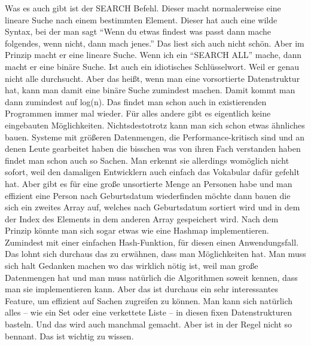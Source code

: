 {Was es auch gibt ist der SEARCH Befehl. Dieser macht normalerweise eine lineare Suche nach einem bestimmten Element. Dieser hat auch eine wilde Syntax, bei der man sagt ``Wenn du etwas findest was passt dann mache folgendes, wenn nicht, dann mach jenes.'' Das liest sich auch nicht schön. Aber im Prinzip macht er eine lineare Suche. Wenn ich ein ``SEARCH ALL'' mache, dann macht er eine binäre Suche. Ist auch ein idiotisches Schlüsselwort. Weil er genau nicht alle durchsucht. Aber das heißt, wenn man eine vorsortierte Datenstruktur hat, kann man damit eine binäre Suche zumindest machen. Damit kommt man dann zumindest auf log(n). Das findet man schon auch in existierenden Programmen immer mal wieder. Für alles andere gibt es eigentlich keine eingebauten Möglichkeiten. Nichtsdestotrotz kann man sich schon etwas ähnliches bauen. Systeme mit größeren Datenmengen, die Performance-kritisch sind und an denen Leute gearbeitet haben die bisschen was von ihren Fach verstanden haben findet man schon auch so Sachen. Man erkennt sie allerdings womöglich nicht sofort, weil den damaligen Entwicklern auch einfach das Vokabular dafür gefehlt hat. Aber \zB gibt es für eine große unsortierte Menge an Personen habe und man effizient eine Person nach Geburtsdatum wiederfinden möchte dann bauen die sich ein zweites Array auf, welches nach Geburtsdatum sortiert wird und in dem der Index des Elements in dem anderen Array gespeichert wird. Nach dem Prinzip könnte man sich sogar etwas wie eine Hashmap implementieren. Zumindest mit einer einfachen Hash-Funktion, für diesen einen Anwendungsfall. Das lohnt sich durchaus das zu erwähnen, dass man Möglichkeiten hat. Man muss sich halt Gedanken machen wo das wirklich nötig ist, weil man große Datenmengen hat und man muss natürlich die Algorithmen soweit kennen, dass man sie implementieren kann. Aber das ist durchaus ein sehr interessantes Feature, um effizient auf Sachen zugreifen zu können. Man kann sich natürlich alles -- wie ein Set oder eine verkettete Liste -- in diesen fixen Datenstrukturen basteln. Und das wird auch manchmal gemacht. Aber ist in der Regel nicht so bennant. Das ist wichtig zu wissen.

}
